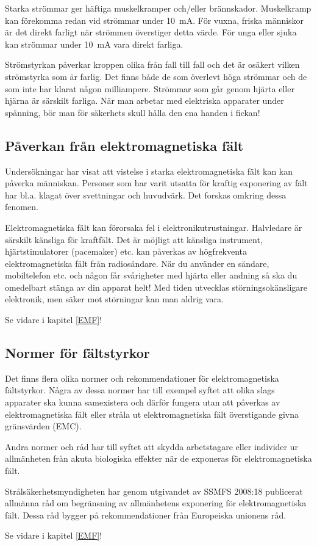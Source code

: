 Starka strömmar ger häftiga muskelkramper och/eller brännskador.
Muskelkramp kan förekomma redan vid strömmar under 10~mA.
För vuxna, friska människor är det direkt farligt när strömmen överstiger
detta värde.
För unga eller sjuka kan strömmar under 10~mA vara direkt farliga.

Strömstyrkan påverkar kroppen olika från fall till fall och det är osäkert
vilken strömstyrka som är farlig.
Det finns både de som överlevt höga strömmar och de som inte har klarat någon
milliampere.
Strömmar som går genom hjärta eller hjärna är särskilt farliga.
När man arbetar med elektriska apparater under spänning, bör man för säkerhets
skull hålla den ena handen i fickan!

\subsection{Påverkan från elektromagnetiska fält}

Undersökningar har visat att vistelse i starka elektromagnetiska fält
kan kan påverka människan.
Personer som har varit utsatta för kraftig exponering av fält har bl.a. klagat
över svettningar och huvudvärk.
Det forskas omkring dessa fenomen.

Elektromagnetiska fält kan förorsaka fel i elektronikutrustningar.
Halvledare är särskilt känsliga för kraftfält.
Det är möjligt att känsliga instrument, hjärtstimulatorer (pacemaker) etc. kan
påverkas av högfrekventa elektromagnetiska fält från radiosändare.
När du använder en sändare, mobiltelefon etc. och någon får svårigheter med
hjärta eller andning så ska du omedelbart stänga av din apparat helt!
Med tiden utvecklas störningsokänsligare elektronik, men säker mot störningar
kan man aldrig vara.

Se vidare i kapitel \ref{EMF}!

\subsection{Normer för fältstyrkor}

Det finns flera olika normer och rekommendationer för elektromagnetiska
fältstyrkor. Några av dessa normer har till exempel syftet att olika slags
apparater ska kunna samexistera och därför fungera utan att påverkas av
elektromagnetiska fält eller stråla ut elektromagnetiska fält överstigande
givna gränsvärden (EMC).

Andra normer och råd har till syftet att skydda arbetstagare eller individer
ur allmänheten från akuta biologiska effekter när de exponeras för
elektromagnetiska fält.

Strålsäkerhetsmyndigheten har genom utgivandet av SSMFS 2008:18 publicerat
allmänna råd om begränsning av allmänhetens exponering för elektromagnetiska
fält.
Dessa råd bygger på rekommendationer från Europeiska unionens råd.

Se vidare i kapitel \ref{EMF}!
